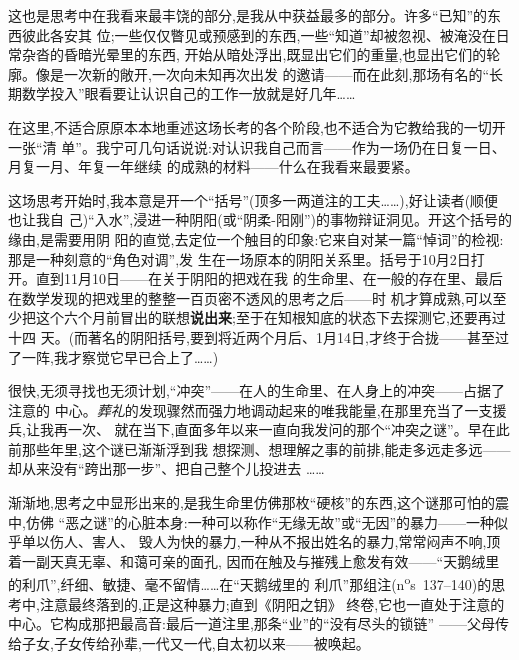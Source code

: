 这也是思考中在我看来最丰饶的部分,是我从中获益最多的部分。许多“已知”的东西彼此各安其
位\dmark{};一些仅仅瞥见或预感到的东西,一些“知道”却被忽视、被淹没在日常杂沓的昏暗光晕里的东西,
开始从暗处浮出,既显出它们的重量,也显出它们的轮廓。像是一次新的敞开,一次向未知再次出发
的邀请——而在此刻,那场有名的“长期数学投入”眼看要让认识自己的工作一放就是好几年……

在这里,不适合原原本本地重述这场长考的各个阶段,也不适合为它教给我的一切开一张“清
单”。我宁可几句话说说:对认识我自己而言——作为一场仍在日复一日、月复一月、年复一年继续
的成熟的材料——什么在我看来最要紧。

这场思考开始时,我本意是开一个“括号”(顶多一两道注的工夫……),好让读者(顺便也让我自
己)“入水”,浸进一种阴阳(或“阴柔-阳刚”)的事物辩证洞见。开这个括号的缘由,是需要用阴
阳的直觉,去定位一个触目的印象:它来自对某一篇“悼词”的检视:那是一种刻意的“角色对调”,发
生在一场原本的阴阳关系里。括号于10月2日打开。直到11月10日——在关于阴阳的把戏在我
的生命里、在一般的存在里、最后在数学发现的把戏里的整整一百页密不透风的思考之后——时
机才算成熟,可以至少把这个六个月前冒出的联想\textbf{说出来};至于在知根知底的状态下去探测它,还要再过十四
天。(而著名的阴阳括号,要到将近两个月后、1月14日,才终于合拢——甚至过了一阵,我才察觉它早已合上了……)

\pmark{}很快,无须寻找也无须计划,“冲突”——在人的生命里、在人身上的冲突——占据了注意的
中心。\emph{葬礼}的发现骤然而强力地调动起来的唯我能量,在那里充当了一支援兵,让我再一次、
就在当下,直面多年以来一直向我发问的那个“冲突之谜”。早在此前那些年里,这个谜已渐渐浮到我
想探测、想理解之事的前排,能走多远走多远——却从来没有“跨出那一步”、把自己整个儿投进去
……

渐渐地,思考之中显形出来的,是我生命里仿佛那枚“硬核”的东西,这个谜那可怕的震中,仿佛
“恶之谜”的心脏本身:一种可以称作“无缘无故”或“无因”的暴力——一种似乎单以伤人、害人、
毁人为快的暴力,一种从不报出姓名的暴力,常常闷声不响,顶着一副天真无辜、和蔼可亲的面孔,
因而在触及与摧残上愈发有效——“天鹅绒里的利爪”,纤细、敏捷、毫不留情……在“天鹅绒里的
利爪”那组注(n\textsuperscript{o}s~137--140)的思考中,注意最终落到的,正是这种暴力;直到《阴阳之钥》
终卷,它也一直处于注意的中心。它构成那把最高音:最后一道注里,那条“业”的“没有尽头的锁链”
——父母传给子女,子女传给孙辈,一代又一代,自太初以来——被唤起。

